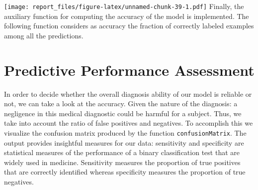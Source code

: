\documentclass[
]{article}
\newenvironment{Shaded}{\begin{snugshade}}{\end{snugshade}}
\newcommand{\ControlFlowTok}[1]{\textcolor[rgb]{0.13,0.29,0.53}{\textbf{#1}}}
\newcommand{\DataTypeTok}[1]{\textcolor[rgb]{0.13,0.29,0.53}{#1}}
\newcommand{\DecValTok}[1]{\textcolor[rgb]{0.00,0.00,0.81}{#1}}
\newcommand{\FloatTok}[1]{\textcolor[rgb]{0.00,0.00,0.81}{#1}}
\newcommand{\KeywordTok}[1]{\textcolor[rgb]{0.13,0.29,0.53}{\textbf{#1}}}
\newcommand{\NormalTok}[1]{#1}
\newcommand{\OperatorTok}[1]{\textcolor[rgb]{0.81,0.36,0.00}{\textbf{#1}}}
\newcommand{\StringTok}[1]{\textcolor[rgb]{0.31,0.60,0.02}{#1}}
\begin{document}
\begin{Shaded}
\end{Shaded}

\texttt{[image: report\_files/figure-latex/unnamed-chunk-39-1.pdf]}
Finally, the auxiliary function for computing the accuracy of the model
is implemented. The following function considers as accuracy the
fraction of correctly labeled examples among all the predictions.

\hypertarget{predictive-performance-assessment}{%
\section{Predictive Performance
Assessment}\label{predictive-performance-assessment}}

In order to decide whether the overall diagnosis ability of our model is
reliable or not, we can take a look at the accuracy. Given the nature of
the diagnosis: a negligence in this medical diagnostic could be harmful
for a subject. Thus, we take into account the ratio of false positives
and negatives. To accomplish this we visualize the confusion matrix
produced by the function \texttt{confusionMatrix}. The output provides
insightful measures for our data: sensitivity and specificity are
statistical measures of the performance of a binary classification test
that are widely used in medicine. Sensitivity measures the proportion of
true positives that are correctly identified whereas specificity
measures the proportion of true negatives.
\end{document}
